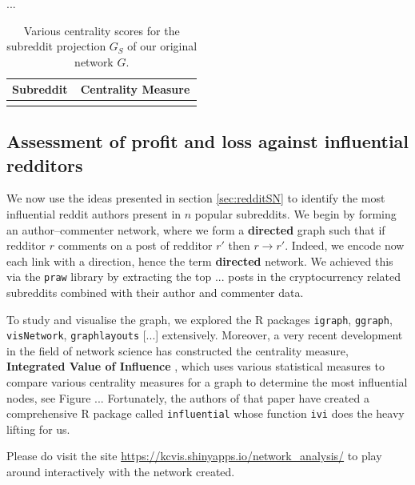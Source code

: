\documentclass[twoside]{report}
\newcommand{\code}{\texttt}
\begin{document}
\begin{spacing}{1}
...
\begin{table}[htbp]
\centering
\begin{tabular}{|l|p{0.65\linewidth}|}
\hline
\multicolumn{1}{|c|}{\textbf{Subreddit}} & \multicolumn{1}{c|}{\textbf{Centrality Measure}}
\tabularnewline \hline
 \tabularnewline \hline
\end{tabular}
\caption{Various centrality scores for the subreddit projection $G_S$ of our original network $G$.}
\label{table:centralitySubreddits}   
\end{table}

\subsection{Assessment of profit and loss against influential redditors}\label{sec:redditPNL}
We now use the ideas presented in section \ref{sec:redditSN} to identify the most influential reddit authors present in $n$ popular subreddits. We begin by forming an author--commenter network, where we form a \textbf{directed} graph such that if redditor $r$ comments on a post of redditor $r'$ then $r \rightarrow r'$. Indeed, we encode now each link with a direction, hence the term \textbf{directed} network. We achieved this via the \code{praw} library by extracting the top ... posts in the cryptocurrency related subreddits combined with their author and commenter data. 

To study and visualise the graph, we explored the R packages \code{igraph}, \code{ggraph}, \code{visNetwork}, \code{graphlayouts} [...] extensively. Moreover, a very recent development in the field of network science has constructed the centrality measure, \textbf{Integrated Value of Influence} \cite{IVIpatterns}, which uses various statistical measures to compare various centrality measures for a graph to determine the most influential nodes, see Figure ... Fortunately, the authors of that paper have created a comprehensive R package called \code{influential} whose function \code{ivi} does the heavy lifting for us. 



Please do visit the site \url{https://kcvis.shinyapps.io/network_analysis/} to play around interactively with the network created. 







\end{spacing}
\end{document}
